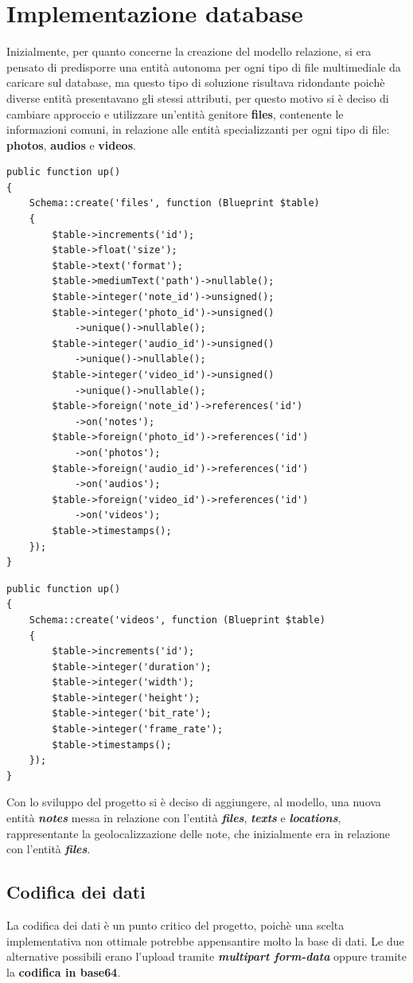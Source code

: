 \section{Implementazione database}
Inizialmente, per quanto concerne la creazione del modello relazione, si era pensato di predisporre una entità autonoma per ogni tipo di file multimediale da caricare sul database, ma questo tipo di soluzione risultava ridondante poichè diverse entità presentavano gli stessi attributi, per questo motivo si è deciso di cambiare approccio e utilizzare un'entità genitore \textbf{files}, contenente le informazioni comuni, in relazione alle entità specializzanti per ogni tipo di file: \textbf{photos}, \textbf{audios} e \textbf{videos}. 
\begin{lstlisting}[caption = Esempio schema tabella files]
public function up()
{
	Schema::create('files', function (Blueprint $table) 
	{
		$table->increments('id');
		$table->float('size');
		$table->text('format');
		$table->mediumText('path')->nullable();
		$table->integer('note_id')->unsigned();
		$table->integer('photo_id')->unsigned()
			->unique()->nullable();
		$table->integer('audio_id')->unsigned()
			->unique()->nullable();
		$table->integer('video_id')->unsigned()
			->unique()->nullable();
		$table->foreign('note_id')->references('id')
			->on('notes');
		$table->foreign('photo_id')->references('id')
			->on('photos');
		$table->foreign('audio_id')->references('id')
			->on('audios');
		$table->foreign('video_id')->references('id')
			->on('videos');
		$table->timestamps();
	});
}
\end{lstlisting}
\begin{lstlisting}[caption=Esempio schema tabella videos]
public function up()
{
	Schema::create('videos', function (Blueprint $table) 
	{
		$table->increments('id');
		$table->integer('duration');
		$table->integer('width');
		$table->integer('height');
		$table->integer('bit_rate');
		$table->integer('frame_rate');
		$table->timestamps();
	});
}
\end{lstlisting}
Con lo sviluppo del progetto si è deciso di aggiungere, al modello, una nuova entità \textit{\textbf{notes}} messa in relazione con l'entità \textit{\textbf{files}}, \textit{\textbf{texts}} e \textit{\textbf{locations}}, rappresentante la geolocalizzazione delle note, che inizialmente era in relazione con l'entità \textit{\textbf{files}}.

\subsection{Codifica dei dati}
La codifica dei dati è un punto critico del progetto, poichè una scelta implementativa non ottimale potrebbe appensantire molto la base di dati.
Le due alternative possibili erano l'upload tramite \textit{\textbf{multipart form-data}} oppure tramite la \textbf{codifica in base64}.

